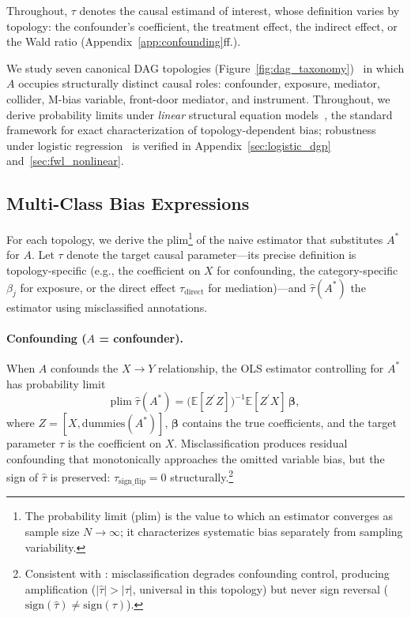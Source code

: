 Throughout, $\tau$ denotes the causal estimand of interest, whose definition varies by topology: the confounder's coefficient, the treatment effect, the indirect effect, or the Wald ratio (Appendix~\ref{app:confounding}ff.).

We study seven canonical DAG topologies (Figure~\ref{fig:dag_taxonomy})~\cite{pearl2009, hernan2020causal} in which $A$ occupies structurally distinct causal roles: confounder, exposure, mediator, collider, M-bias variable, front-door mediator, and instrument. Throughout, we derive probability limits under \emph{linear} structural equation models~\cite{carroll2006}, the standard framework for exact characterization of topology-dependent bias; robustness under logistic regression~\cite{stefanski_carroll1985} is verified in Appendix~\ref{sec:logistic_dgp} and~\ref{sec:fwl_nonlinear}.

\subsection{Multi-Class Bias Expressions}
\label{sec:bias_expressions}

For each topology, we derive the $\text{plim}$\footnote{The probability limit (plim) is the value to which an estimator converges as sample size $N \to \infty$; it characterizes systematic bias separately from sampling variability.} of the naive estimator that substitutes $A^*$ for $A$. Let $\tau$ denote the target causal parameter---its precise definition is topology-specific (e.g., the coefficient on $X$ for confounding, the category-specific $\beta_j$ for exposure, or the direct effect $\tau_{\text{direct}}$ for mediation)---and $\hat{\tau}(A^*)$ the estimator using misclassified annotations.

\paragraph{Confounding ($A$ = confounder).}
When $A$ confounds the $X{\to}Y$ relationship, the OLS estimator controlling for $A^*$ has probability limit
\begin{equation}
\label{eq:confounding}
\text{plim}\;\hat{\tau}(A^*) = \bigl(\mathbb{E}[Z^{\prime}Z]\bigr)^{-1}\mathbb{E}[Z^{\prime}X]\,\boldsymbol{\beta},
\end{equation}
where $Z = [X, \text{dummies}(A^*)]$, $\boldsymbol{\beta}$ contains the true coefficients, and the target parameter $\tau$ is the coefficient on $X$. Misclassification produces residual confounding that monotonically approaches the omitted variable bias, but the sign of $\hat{\tau}$ is preserved: $\tau_{\text{sign\_flip}} = 0$ structurally.\footnote{Consistent with \citet{brenner1993}: misclassification degrades confounding control, producing amplification ($|\hat{\tau}| > |\tau|$, universal in this topology) but never sign reversal ($\text{sign}(\hat{\tau}) \neq \text{sign}(\tau)$).}

